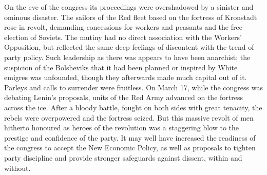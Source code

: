 On the eve of the congress its proceedings were overshadowed by a sinister and ominous disaster. The sailors of the Red fleet based on the fortress of Kronstadt rose in revolt, demanding concessions for workers and peasants and the free election of Soviets. The mutiny had no direct association with the Workers' Opposition, but reflected the same deep feelings of discontent with the trend of party policy. Such leadership as there was appears to have been anarchist; the suspicion of the Bolsheviks that it had been planned or inspired by White emigres was unfounded, though they afterwards made much capital out of it. Parleys and calls to surrender were fruitless. On March 17, while the congress was debating Lenin's proposals, units of the Red Army advanced on the fortress across the ice. After a bloody battle, fought on both sides with great tenacity, the rebels were overpowered and the fortress seized. But this massive revolt of men hitherto honoured as heroes of the revolution was a staggering blow to the prestige and confidence of the party. It may well have increased the readiness of the congress to accept the New Economic Policy, as well as proposals to tighten party discipline and provide stronger safeguards against dissent, within and without. 

